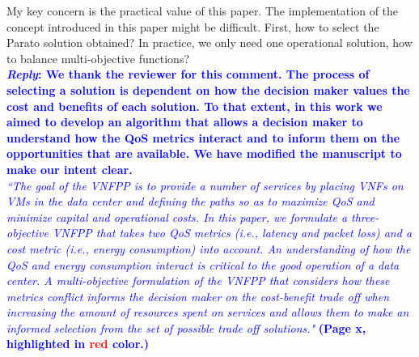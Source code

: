 \begin{enumerate}
            \textsf{My key concern is the practical value of this paper. The implementation of the concept introduced in this paper might be difficult. First, how to select the Parato solution obtained? In practice, we only need one operational solution, how to balance multi-objective functions?}\\
            \textcolor{blue}{\textbf{\textit{Reply}: We thank the reviewer for this comment. The process of selecting a solution is dependent on how the decision maker values the cost and benefits of each solution. To that extent, in this work we aimed to develop an algorithm that allows a decision maker to understand how the QoS metrics interact and to inform them on the opportunities that are available. We have modified the manuscript to make our intent clear.}}\\
            \textcolor{blue}{\textit{``The goal of the VNFPP is to provide a number of services by placing VNFs on VMs in the data center and defining the paths so as to maximize QoS and minimize capital and operational costs. In this paper, we formulate a three-objective VNFPP that takes two QoS metrics (i.e., latency and packet loss) and a cost metric (i.e., energy consumption) into account. An understanding of how the QoS and energy consumption interact is critical to the good operation of a data center. A multi-objective formulation of the VNFPP that considers how these metrics conflict informs the decision maker on the cost-benefit trade off when increasing the amount of resources spent on services and allows them to make an informed selection from the set of possible trade off solutions."} \textbf{(Page x, highlighted in \textcolor{red}{red} color.)}}\\


\end{enumerate}
